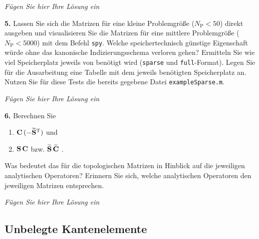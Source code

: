 \documentclass[Protokollheft.tex]{subfiles}
\begin{document}
\emph{Fügen Sie hier Ihre Lösung ein}

        \begin{framed}
	\noindent \textbf{5.} Lassen Sie sich die Matrizen für eine kleine Problemgröße ($N_{\text{P}}<50$) direkt
                    ausgeben und visualisieren Sie die Matrizen für eine mittlere
                    Problemgröße ($N_{\text{P}}<5000$) mit dem Befehl \lstinline{spy}. Welche speichertechnisch günstige
                    Eigenschaft würde ohne das kanonische Indizierungsschema verloren gehen?
                    Ermitteln Sie wie viel Speicherplatz jeweils von \matlab benötigt wird
                    (\lstinline{sparse} und \lstinline{full}-Format). Legen Sie für die Ausarbeitung eine Tabelle mit dem jeweils benötigten Speicherplatz an. Nutzen Sie für diese Tests die bereits gegebene Datei \lstinline{exampleSparse.m}.\label{exer:spyStorage}
\end{framed}

\emph{Fügen Sie hier Ihre Lösung ein}

        \begin{framed}
	\noindent \textbf{6.} Berechnen Sie
                    \begin{enumerate}
                        \item $\mathbf{C}\, (-\widetilde{\mathbf{S}}^{\text{T}})$ und
                        \item $\mathbf{S}\, \mathbf{C}$ bzw. $\widetilde{\mathbf{S}}\, \widetilde{\mathbf{C}}$ \; .
                    \end{enumerate}
                    Was bedeutet das für die topologischen Matrizen in Hinblick
                    auf die jeweiligen analytischen Operatoren? Erinnern Sie sich, welche analytischen Operatoren den jeweiligen Matrizen entsprechen.\label{exer:CG_SC}
\end{framed}

\emph{Fügen Sie hier Ihre Lösung ein}

{\subsection{Unbelegte Kantenelemente}}
\end{document}
